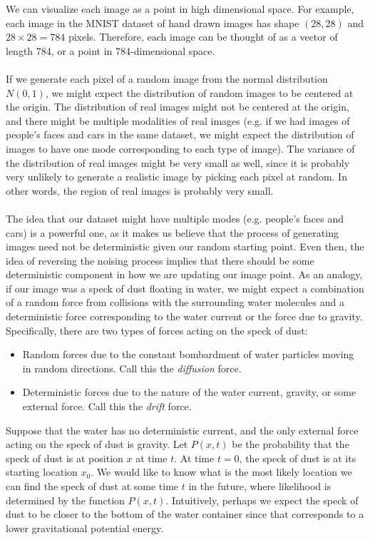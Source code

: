 \documentclass{article}
\begin{document}

We can visualize each image as a point in high dimensional space. For example, each image in the MNIST dataset of hand drawn images has shape $(28,28)$ and $28\times 28=784$ pixels. Therefore, each image can be thought of as a vector of length 784, or a point in 784-dimensional space. 
\\
\\
If we generate each pixel of a random image from the normal distribution $N(0,1)$, we might expect the distribution of random images to be centered at the origin. The distribution of real images might not be centered at the origin, and there might be multiple modalities of real images (e.g. if we had images of people's faces and cars in the same dataset, we might expect the distribution of images to have one mode corresponding to each type of image). The variance of the distribution of real images might be very small as well, since it is probably very unlikely to generate a realistic image by picking each pixel at random. In other words, the region of real images is probably very small. 
\\
\\
The idea that our dataset might have multiple modes (e.g. people's faces and cars) is a powerful one, as it makes us believe that the process of generating images need not be deterministic given our random starting point. Even then, the idea of reversing the noising process implies that there should be some deterministic component in how we are updating our image point. As an analogy, if our image was a speck of dust floating in water, we might expect a combination of a random force from collisions with the surrounding water molecules and a deterministic force corresponding to the water current or the force due to gravity. Specifically, there are two types of forces acting on the speck of dust:
\begin{itemize}
    \item Random forces due to the constant bombardment of water particles moving in random directions. Call this the \textit{diffusion} force.
    \item Deterministic forces due to the nature of the water current, gravity, or some external force. Call this the \textit{drift} force. 
\end{itemize}
Suppose that the water has no deterministic current, and the only external force acting on the speck of dust is gravity. Let $P(x,t)$ be the probability that the speck of dust is at position $x$ at time $t$. At time $t=0$, the speck of dust is at its starting location $x_0$. We would like to know what is the most likely location we can find the speck of dust at some time $t$ in the future, where likelihood is determined by the function $P(x,t)$. Intuitively, perhaps we expect the speck of dust to be closer to the bottom of the water container since that corresponds to a lower gravitational potential energy. 
\end{document}
